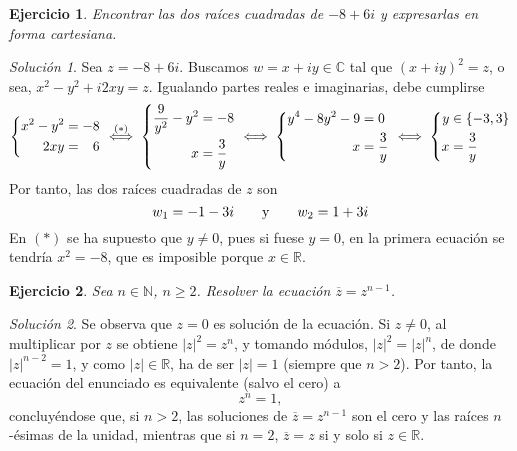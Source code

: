 \documentclass[11pt]{report}
\newcommand{\R}{\mathbb R}
\newcommand{\N}{\mathbb N}
\newcommand{\C}{\mathbb C}
\newtheorem{exercise}{Ejercicio}
\theoremstyle{remark}
\newtheorem*{resolution}{Solución}
\begin{document}
\begin{exercise}
    Encontrar las dos raíces cuadradas de $-8+6i$ y expresarlas en forma cartesiana.
\end{exercise}

\begin{resolution}
Sea $z = -8+6i$. Buscamos $w = x+iy \in \C$ tal que $(x+iy)^2 = z$, o sea, $x^2-y^2+i2xy = z$.
Igualando partes reales e imaginarias, debe cumplirse
\[\left\{ \begin{alignedat}{2}
    x^2-y^2&=-&8 \\
    2xy &= &6
\end{alignedat} \\ \right. \overset{(*)}{\iff} \left\{ \begin{alignedat}{2}
    \frac{9}{y^2}-y^2&=-&8 \\
    x &= \frac{3}{y}
\end{alignedat} \\ \right. \iff \left\{ \begin{alignedat}{2}
    y^4-8y^2-9 &= 0 \\
    x &= \frac{3}{y}
\end{alignedat} \\ \right. \iff \left\{ \begin{alignedat}{2}
    y &\in \{-3,3\} \\
    x &= \frac{3}{y}
\end{alignedat} \\ \right.\]
Por tanto, las dos raíces cuadradas de $z$ son
\[w_1 = -1-3i \qquad \textup{y} \qquad w_2 = 1+3i\]
En $(*)$ se ha supuesto que $y \neq 0$, pues si fuese $ y =0$, en la primera ecuación se tendría $x^2 = -8$, que es imposible porque $x \in \R$.
\end{resolution}

\begin{exercise}
    Sea $n \in \N$, $n \geq 2$. Resolver la ecuación $\overline{z} = z^{n-1}$.
\end{exercise}

\begin{resolution}
Se observa que $z = 0$ es solución de la ecuación. Si $z \neq 0$, al multiplicar por $z$ se obtiene $|z|^2 = z^n$, y tomando módulos, $|z|^2 = |z|^n$, de donde $|z|^{n-2} = 1$, y como $|z| \in \R$, ha de ser $|z| = 1$ (siempre que $n >2$). Por tanto, la ecuación del enunciado es equivalente (salvo el cero) a
\[z^n = 1,\]
concluyéndose que, si $n>2$, las soluciones de $\overline{z} = z^{n-1}$ son el cero y las raíces $n$-ésimas de la unidad, mientras que si $n = 2$, $\overline{z} = z$ si y solo si $z \in \R$.
\end{resolution}
\end{document}

